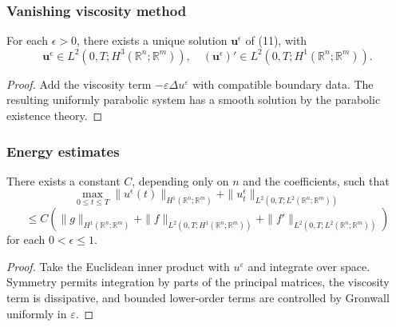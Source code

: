 \subsubsection{Vanishing viscosity method}

\begin{theorem}
\label{thm:symmetric-hyperbolic-approximate-solutions}

For each $\epsilon > 0$, there exists a unique solution $\mathbf{u}^\epsilon$ of (11), with
\[
\mathbf{u}^\epsilon \in L^2(0,T; H^3(\mathbb{R}^n; \mathbb{R}^m)), \quad (\mathbf{u}^\epsilon)' \in L^2(0,T; H^1(\mathbb{R}^n; \mathbb{R}^m)).
\tag{12}
\]
\end{theorem}

\begin{proof}
\sketch Add the viscosity term $-\varepsilon\Delta u^{\varepsilon}$ with compatible boundary data. The resulting uniformly parabolic system has a smooth solution by the parabolic existence theory.
\end{proof}

\subsubsection{Energy estimates}

\begin{theorem}
\label{thm:symmetric-hyperbolic-energy-estimates}

There exists a constant $C$, depending only on $n$ and the coefficients, such that
\[
\max_{0 \leq t \leq T} \|u^\epsilon(t)\|_{H^1(\mathbb{R}^n;\mathbb{R}^m)} + \|u_t^\epsilon\|_{L^2(0,T;L^2(\mathbb{R}^n;\mathbb{R}^m))}
\]
\[
\leq C(\|g\|_{H^1(\mathbb{R}^n;\mathbb{R}^m)} + \|f\|_{L^2(0,T;H^1(\mathbb{R}^n;\mathbb{R}^m))} + \|f'\|_{L^2(0,T;L^2(\mathbb{R}^n;\mathbb{R}^m))})
\tag{17}
\]
for each $0 < \epsilon \leq 1$.
\end{theorem}

\begin{proof}
\sketch Take the Euclidean inner product with $u^{\varepsilon}$ and integrate over space. Symmetry permits integration by parts of the principal matrices, the viscosity term is dissipative, and bounded lower-order terms are controlled by Gronwall uniformly in $\varepsilon$.
\end{proof}

